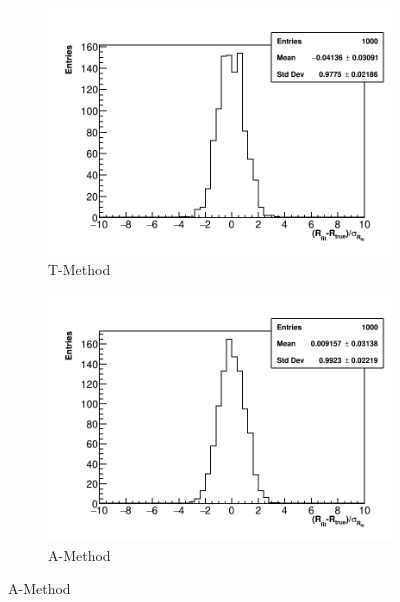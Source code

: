 \begin{figure}[]
\centering
    \begin{subfigure}[t]{0.45\textwidth}
        \centering
        \includegraphics[width=\textwidth]{Rpull_TMethod}
        \caption{T-Method}
    \end{subfigure}
    \hspace{1mm}
    \begin{subfigure}[t]{0.45\textwidth}
        \centering
        \includegraphics[width=\textwidth]{Rpull_AMethod}
        \caption{A-Method}
    \end{subfigure}%


\end{figure}
